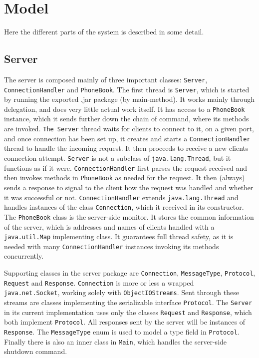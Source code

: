 \documentclass[a4paper,titlepage]{article}
\newcommand{\code}{\texttt}
\begin{document}
\section{Model}
Here the different parts of the system is described in some detail.
\subsection*{Server}
The server is composed mainly of three important classes: \code{Server}, \\\code{ConnectionHandler} and \code{PhoneBook}. The first thread is \code{Server}, which is started by running the exported .jar package (by main-method). It works mainly through delegation, and does very little actual work itself. It has access to a \code{PhoneBook} instance, which it sends further down the chain of command, where its methods are invoked. \code{The Server} thread waits for clients to connect to it, on a given port, and once connection has been set up, it creates and starts a \code{ConnectionHandler} thread to handle the incoming request. It then proceeds to receive a new clients connection attempt. \code{Server} is not a subclass of \code{java.lang.Thread}, but it functions as if it were.
\code{ConnectionHandler} first parses the request received and then invokes methods in \code{PhoneBook} as needed for the request. It then (always) sends a response to signal to the client how the request was handled and whether it was successful or not. \code{ConnectionHandler} extends \code{java.lang.Thread} and handles instances of the class \code{Connection}, which it received in its constructor.
The \code{PhoneBook} class is the server-side monitor. It stores the common information of the server, which is addresses and names of clients handled with a \code{java.util.Map} implementing class. It guarantees full thread safety, as it is needed with many \code{ConnectionHandler} instances invoking its methods concurrently.

Supporting classes in the server package are \code{Connection}, \code{MessageType}, \code{Protocol}, \code{Request} and \code{Response}. \code{Connection} is more or less a wrapped \\\code{java.net.Socket}, working solely with \code{ObjectIOStreams}. Sent through these streams are classes implementing the serializable interface \code{Protocol}. The \code{Server} in its current implementation uses only the classes \code{Request} and \code{Response}, which both implement \code{Protocol}. All responses sent by the server will be instances of \code{Response}. The \code{MessageType} enum is used to model a type field in \code{Protocol}. Finally there is also an inner class in \code{Main}, which handles the server-side shutdown command.
\end{document}

